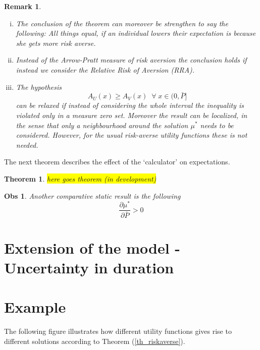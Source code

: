 \documentclass[10pt]{article}
\newtheorem{theorem}{Theorem}
\newtheorem{obs}{Obs}
\newtheorem{rem}{Remark}
\begin{document}
\begin{rem}
\begin{enumerate}[(i)]
\item The conclusion of the theorem can moreover be strengthen to say the following: All things equal, if an individual lowers their expectation is because she gets more risk averse.
\item Instead of the Arrow-Pratt measure of risk aversion the conclusion holds if instead we consider the Relative Risk of Aversion (RRA). 
\item The hypothesis
\[A_U(x)\geq A_V(x)\;\;\forall\;x\in(0,\bar{P}]\]
can be relaxed if instead of considering the whole interval the inequality is violated only in a measure zero set. Moreover the result can be localized, in the sense that only a neighbourhood around the solution $\mu^*$ needs to be considered. However, for the usual risk-averse utility functions these is not needed.
\end{enumerate}
\end{rem}


The next theorem describes the effect of the `calculator' on expectations.


\begin{theorem}
\colorbox{yellow}{here goes theorem (in development)}
\end{theorem}


\begin{obs}
Another comparative static result is the following
\[\frac{\partial \mu^{*}}{\partial \bar{P}}>0\]
\end{obs}

\pagebreak

\section{Extension of the model - Uncertainty in duration}


\pagebreak

\section{Example}

The following figure illustrates how different utility functions gives rise to different solutions according to Theorem (\ref{th_riskaverse}).
\end{document}
